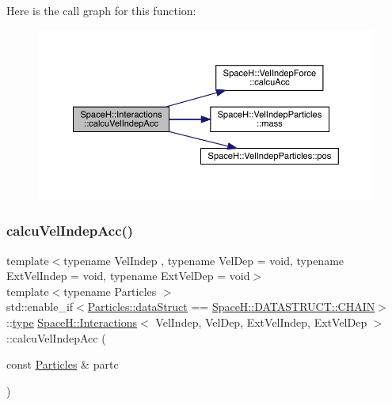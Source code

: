 Here is the call graph for this function\+:
\nopagebreak
\begin{figure}[H]
\begin{center}
\leavevmode
\includegraphics[width=350pt]{class_space_h_1_1_interactions_a648a2de8140f2f29fc9599fe8aed3b60_cgraph}
\end{center}
\end{figure}
\mbox{\label{class_space_h_1_1_interactions_a80aac6bfbb89e22788cff413ee62db1c}} 
\subsubsection{\texorpdfstring{calcu\+Vel\+Indep\+Acc()}{calcuVelIndepAcc()}\hspace{0.1cm}{\footnotesize\ttfamily [2/2]}}
{\footnotesize\ttfamily template$<$typename Vel\+Indep , typename Vel\+Dep  = void, typename Ext\+Vel\+Indep  = void, typename Ext\+Vel\+Dep  = void$>$ \\
template$<$typename Particles $>$ \\
std\+::enable\+\_\+if$<$\mbox{\hyperlink{class_space_h_1_1_vel_indep_particles_a066cbb08e0d444c27e2f71c30092e13f}{Particles\+::data\+Struct}} == \mbox{\hyperlink{namespace_space_h_a4782f089179a3c269891f02482b072dfa014d2cf3cdc3af6f4f92c09190860e33}{Space\+H\+::\+D\+A\+T\+A\+S\+T\+R\+U\+C\+T\+::\+C\+H\+A\+IN}}$>$\+::\mbox{\hyperlink{class_space_h_1_1_interactions_aa45fc9367bfa0b8693700525ffa2655f}{type}} \mbox{\hyperlink{class_space_h_1_1_interactions}{Space\+H\+::\+Interactions}}$<$ Vel\+Indep, Vel\+Dep, Ext\+Vel\+Indep, Ext\+Vel\+Dep $>$\+::calcu\+Vel\+Indep\+Acc (\begin{DoxyParamCaption}\item[{const \mbox{\hyperlink{struct_space_h_1_1_particles}{Particles}} \&}]{partc }\end{DoxyParamCaption})\hspace{0.3cm}{\ttfamily [inline]}}

